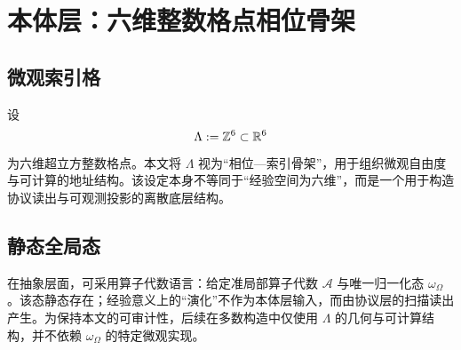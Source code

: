\section{本体层：六维整数格点相位骨架}

\subsection{微观索引格}

设
\[
\Lambda := \mathbb{Z}^{6}\subset \mathbb{R}^{6}
\]
为六维超立方整数格点。本文将 $\Lambda$ 视为“相位—索引骨架”，用于组织微观自由度与可计算的地址结构。该设定本身不等同于“经验空间为六维”，而是一个用于构造协议读出与可观测投影的离散底层结构。

\subsection{静态全局态}

在抽象层面，可采用算子代数语言：给定准局部算子代数 $\mathcal{A}$ 与唯一归一化态 $\omega_{\Omega}$。该态静态存在；经验意义上的“演化”不作为本体层输入，而由协议层的扫描读出产生。为保持本文的可审计性，后续在多数构造中仅使用 $\Lambda$ 的几何与可计算结构，并不依赖 $\omega_{\Omega}$ 的特定微观实现。


